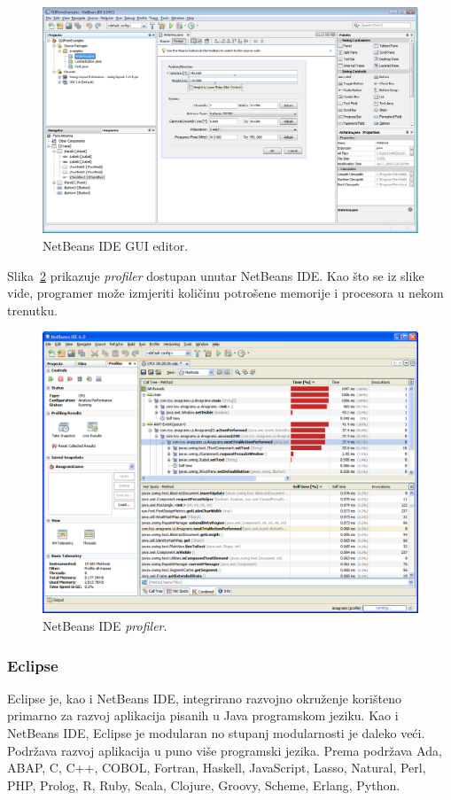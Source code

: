\begin{figure}[h!]
    \caption{NetBeans IDE GUI editor.}
    \label{fig:netbeans_ide_gui_editor}
    \centering
    \includegraphics[max width=\textwidth]{images/netbeans_ide_gui_editor.png}
\end{figure}

Slika~\ref{fig:netbeans_ide_profiler} prikazuje \emph{profiler} dostupan unutar NetBeans IDE. Kao što se iz slike vide, programer može izmjeriti količinu potrošene memorije i procesora u nekom trenutku.

\begin{figure}[h!]
    \caption{NetBeans IDE \emph{profiler}.}
    \label{fig:netbeans_ide_profiler}
    \centering
    \includegraphics[max width=\textwidth]{images/netbeans_ide_profiler.png}
\end{figure}

\subsubsection{Eclipse}
Eclipse je, kao i NetBeans IDE, integrirano razvojno okruženje korišteno primarno za razvoj aplikacija pisanih u Java programskom jeziku. Kao i NetBeans IDE, Eclipse je modularan no stupanj modularnosti je daleko veći. Podržava razvoj aplikacija u puno više programski jezika. Prema\cite{eclipsesoftware} podržava Ada, ABAP, C, C++, COBOL, Fortran, Haskell, JavaScript, Lasso, Natural, Perl, PHP, Prolog, R, Ruby, Scala, Clojure, Groovy, Scheme, Erlang, Python.

